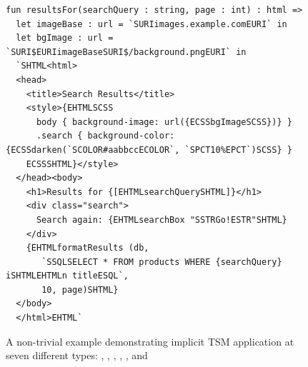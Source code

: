 \begin{figure}[h]
\begin{lstlisting}[deletekeywords={for}, escapechar=@]
fun resultsFor(searchQuery : string, page : int) : html => 
  let imageBase : url = `SURIimages.example.comEURI` in 
  let bgImage : url = `SURI$EURIimageBaseSURI$/background.pngEURI` in 
  `SHTML<html>
  <head>
    <title>Search Results</title>
    <style>{EHTMLSCSS
      body { background-image: url({ECSSbgImageSCSS})} }
      .search { background-color: {ECSSdarken(`SCOLOR#aabbccECOLOR`, `SPCT10%EPCT`)SCSS} }
    ECSSSHTML}</style>
  </head><body>
    <h1>Results for {[EHTMLsearchQuerySHTML]}</h1>
    <div class="search">
      Search again: {EHTMLsearchBox "SSTRGo!ESTR"SHTML}
    </div>
    {EHTMLformatResults (db, 
       `SSQLSELECT * FROM products WHERE {searchQuery} iSHTMLEHTMLn titleESQL`,
       10, page)SHTML}
  </body>
  </html>EHTML`
\end{lstlisting}
\caption{A non-trivial example demonstrating implicit TSM application at seven different types: , , , , ,  and }
\label{fig:big-html-example}
\end{figure}


